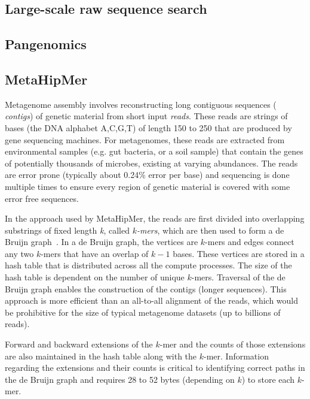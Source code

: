 \subsection{Large-scale raw sequence search}

\subsection{Pangenomics}



\subsection{MetaHipMer}

Metagenome assembly involves reconstructing long contiguous sequences ({\it
contigs}) of genetic material from short input {\it reads}. These reads are
strings of bases (the DNA alphabet A,C,G,T) of length 150 to 250 that are
produced by gene sequencing machines.  For metagenomes, these reads are
extracted from environmental samples (e.g. gut bacteria, or a soil sample) that
contain the genes of potentially thousands of microbes, existing at varying
abundances.  The reads are error prone (typically about 0.24\% error per base)
and sequencing is done multiple times to ensure every region of genetic material
is covered with some error free sequences.

In the approach used by MetaHipMer, the reads are first divided into overlapping
substrings of fixed length {\it k}, called {\it $k$-mers}, which are then used
to form a de Bruijn graph~\cite{CompeauPeTe11}. In a de Bruijn graph, the
vertices are $k$-mers and edges connect any two $k$-mers that have an overlap of
$k-1$ bases. These vertices are stored in a hash table that is distributed
across all the compute processes.  The size of the hash table is dependent on
the number of unique $k$-mers.  Traversal of the de Bruijn graph enables the
construction of the contigs (longer sequences).  This approach is more efficient
than an all-to-all alignment of the reads, which would be prohibitive for the
size of typical metagenome datasets (up to billions of reads).

Forward and backward extensions of the $k$-mer and the counts of those
extensions are also maintained in the hash table along with the $k$-mer.
Information regarding the extensions and their counts is critical to identifying
correct paths in the de Bruijn graph and requires 28 to 52 bytes (depending on
$k$) to store each $k$-mer.

